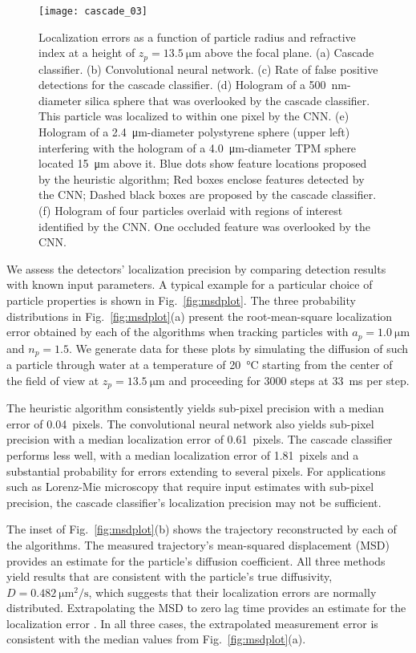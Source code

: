 \begin{figure}
  \centering
  \texttt{[image: cascade\_03]}
  \caption{Localization errors as a function of particle
  radius and refractive index at a height of $z_p = \SI{13.5}{\um}$
  above the focal plane. (a) Cascade classifier. (b) Convolutional
  neural network. (c) Rate of false positive detections for the 
  cascade classifier. (d) Hologram of a \SI{500}{\nm}-diameter silica sphere that was
  overlooked by the cascade classifier.  This particle was localized
  to within one pixel by the CNN.
  (e) Hologram of a \SI{2.4}{\um}-diameter
  polystyrene sphere (upper left) interfering with the hologram of
  a \SI{4.0}{\um}-diameter TPM sphere located \SI{15}{\um} above it.
  Blue dots show feature locations proposed by the heuristic
  algorithm; Red boxes enclose features detected by the CNN; 
  Dashed black boxes are proposed by the cascade classifier.
  (f) Hologram of four particles
  overlaid with regions of interest identified by the CNN.  One
  occluded feature was overlooked by the CNN.
  }
  \label{fig:figure3}
\end{figure}

We assess the detectors' localization precision by 
comparing detection results with known 
input parameters.
A typical example for a particular choice of particle
properties is shown in Fig.~\ref{fig:msdplot}.
The three probability distributions 
in Fig.~\ref{fig:msdplot}(a) present
the root-mean-square localization error
obtained by each of the algorithms when tracking
particles with
$a_p =\SI{1.0}{\um}$ and $n_p = \num{1.5}$.
We generate data for these plots by simulating the
diffusion of such a particle through water
at a temperature of \SI{20}{\celsius} starting from 
the center of the field of view at $z_p=\SI{13.5}{\um}$
and proceeding for \num{3000} steps at \SI{33}{\ms} per step.

The heuristic algorithm consistently 
yields sub-pixel precision with a median error of 
\SI{0.04}{pixels}. 
The convolutional neural network also yields sub-pixel
precision with a median localization error of \SI{0.61}{pixels}.
The cascade classifier performs less well,
with a median localization error of \SI{1.81}{pixels} and
a substantial probability
for errors extending to several pixels.
For applications such as Lorenz-Mie microscopy
that require input estimates with sub-pixel precision,
the cascade classifier's localization precision may not
be sufficient.

The inset of Fig.~\ref{fig:msdplot}(b) shows the trajectory
reconstructed by each of the algorithms.
The measured trajectory's mean-squared displacement (MSD)
provides an estimate for the particle's
diffusion coefficient.
All three methods yield results that are consistent with
the particle's true diffusivity,
$D = \SI{0.482}{\um^2 \per \second}$,
which suggests that
their localization errors are normally distributed.
Extrapolating the MSD to zero lag time 
provides an estimate for the localization error \cite{crocker96,michalet12}.
In all three cases, the extrapolated measurement error
is consistent with the median values from Fig.~\ref{fig:msdplot}(a). 

